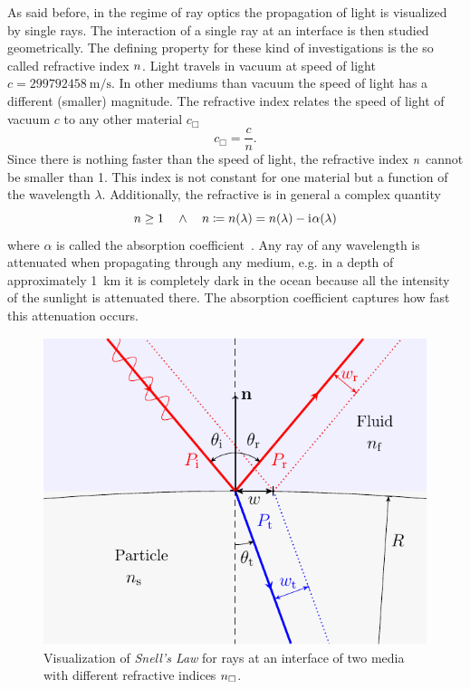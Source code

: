 As said before, in the regime of ray optics the propagation of light is 
visualized by single rays. The interaction of a single ray at an interface is 
then studied geometrically. The defining property for these kind of 
investigations is the so called refractive index $n$. Light travels 
in vacuum at speed of light $c=\SI{299792458}{\m\per\s}$. In other mediums than 
vacuum the speed of light has a different (smaller) magnitude. The refractive 
index relates the speed of light of vacuum $c$ to any other material $c_{\Box}$
\begin{equation}
  c_{\Box} = \frac{c}{n}.
  \label{eq:Th-lightspeed}
\end{equation}
Since there is nothing faster than the speed of light, the refractive index 
$n$ cannot be smaller than 1. This index is not constant for one 
material but a function of the wavelength $\lambda$. Additionally, the 
refractive is in general a complex quantity
\begin{equation}
  n\geq 1 \quad \wedge \quad n \coloneqq 
  n(\lambda) = n(\lambda) - \mathrm{i}\mkern1mu\alpha(\lambda)
  \label{eq:Th-refractive-index}
\end{equation}
where $\alpha$ is called the absorption coefficient~\cite{Jackson2013}. Any ray 
of any wavelength is attenuated when propagating through any medium, e.g. in a 
depth of approximately \SI{1}{\kilo\meter} it is completely dark in the ocean 
because all the intensity of the sunlight is attenuated there. The absorption 
coefficient captures how fast this attenuation occurs.

\begin{figure}[htp]
  \centering
  \includegraphics[]{Plots/cache/Snell.pdf}
  \caption{Visualization of \emph{Snell's Law} for rays at an interface of two 
  media with different refractive indices $n_{\Box}$.}
  \label{fig:Th-Snell}
\end{figure}

